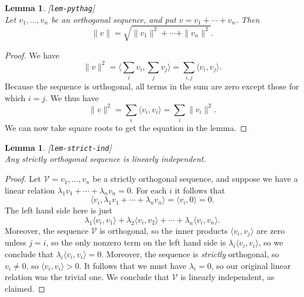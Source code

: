\documentclass{amsart}
\newcommand{\lbl}[1]{\label{#1}\textup{[\texttt{#1}]}\ \\}
\newcommand{\lbl}{\label}
\newcommand{\lm}        {\lambda}
\newcommand{\ip}[1]     {\langle #1\rangle}
\newcommand{\CV}        {{\mathcal{V}}}
\renewcommand{\:}       {\colon}
\newtheorem{lemma}[theorem]{Lemma}
\theoremstyle{definition}
\begin{document}
\begin{lemma}\lbl{lem-pythag}
 Let $v_1,\dotsc,v_n$ be an orthogonal sequence, and put
 $v=v_1+\dotsb+v_n$.  Then 
 \[ \|v\| = \sqrt{\|v_1\|^2 + \dotsb + \|v_n\|^2}. \]
\end{lemma}
\begin{proof}
 We have 
 \[ \|v\|^2 = \ip{\sum_iv_i,\sum_jv_j} = 
     \sum_{i,j} \ip{v_i,v_j}.
 \]
 Because the sequence is orthogonal, all terms in the sum
 are zero except those for which $i=j$.  We thus have 
 \[ \|v\|^2 = \sum_i \ip{v_i,v_i} = \sum_i \|v_i\|^2. \]
 We can now take square roots to get the equation in the
 lemma. 
\end{proof}

\begin{lemma}\lbl{lem-strict-ind}
 Any strictly orthogonal sequence is linearly independent.
\end{lemma}
\begin{proof}
 Let $\CV=v_1,\dotsc,v_n$ be a strictly orthogonal sequence,
 and suppose we have a linear relation
 $\lm_1v_1+\dotsb+\lm_nv_n=0$.  For each $i$ it follows that 
 \[ \ip{v_i,\lm_1v_1+\dotsb+\lm_nv_n} = \ip{v_i,0} = 0. \]
 The left hand side here is just
 \[ \lm_1\ip{v_i,v_1} + \lm_2\ip{v_i,v_2} +
     \dotsb + \lm_n\ip{v_i,v_n}.
 \]
 Moreover, the sequence $\CV$ is orthogonal, so the inner
 products $\ip{v_i,v_j}$ are zero unless $j=i$, so the only
 nonzero term on the left hand side is $\lm_i\ip{v_i,v_i}$,
 so we conclude that $\lm_i\ip{v_i,v_i}=0$.  Moreover, the
 sequence is \emph{strictly} orthogonal, so $v_i\neq 0$, so
 $\ip{v_i,v_i}>0$.  It follows that we must have $\lm_i=0$,
 so our original linear relation was the trivial one.  We
 conclude that $\CV$ is linearly independent, as claimed.
\end{proof}
\end{document}
